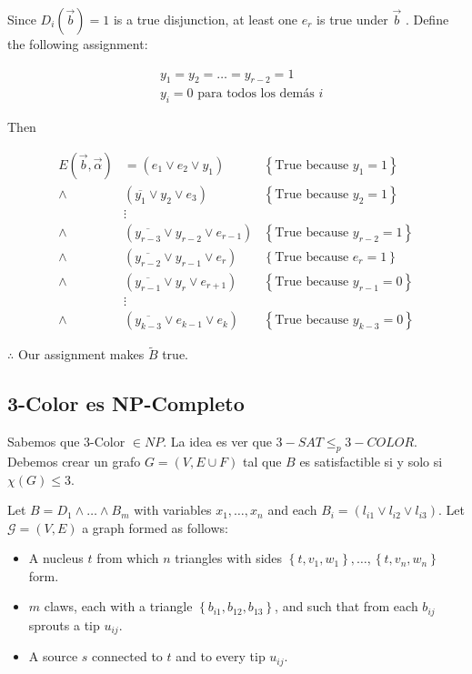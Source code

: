 \documentclass[a4paper, 12pt]{article}
\begin{document}
Since $D_i(\overrightarrow{b}) = 1$ is a true disjunction, at least one $e_r$
is true under $\overrightarrow{b}$ . Define the following assignment:

\begin{align*}
    &y_1 = y_2 = \ldots = y_{r-2} = 1 \\ 
    &y_i = 0 \text{ para todos los demás $i$}
\end{align*}

Then

\begin{align*}
    E(\overrightarrow{b}, \overrightarrow{\alpha}) &= \left( e_1 \lor e_2 \lor y_1 \right) &\left\{ \text{True because } y_1 = 1 \right\}  \\ 
    \land &\left( \overline{y_1} \lor  y_2 \lor  e_3 \right) &\left\{ \text{True because } y_2 = 1 \right\}  \\ 
          &\vdots& \\ 
    \land &(\overline{y_{r-3}} \lor  y_{r-2} \lor  e_{r-1}) &\left\{ \text{True because } y_{r-2} = 1 \right\}  \\ 
    \land&(\overline{y_{r-2}} \lor  y_{r-1} \lor  e_r) &\left\{ \text{True because } e_{r} = 1 \right\}  \\ 
    \land&(\overline{y_{r-1}} \lor y_{r} \lor  e_{r+1}) &\left\{ \text{True because } y_{r-1} = 0 \right\}  \\ 
         &\vdots &\\ 
    \land &(\overline{y_{k-3}} \lor e_{k-1} \lor  e_k) &\left\{ \text{True because } y_{k-3} = 0 \right\} 
\end{align*}

$\therefore $ Our assignment makes $\tilde{ B }$ true.

\pagebreak 


\subsection{3-Color es NP-Completo}

Sabemos que $3$-Color $\in NP$. La idea es ver que $3-SAT \leq_p 3-COLOR$. 
Debemos crear un grafo $G = (V, E \cup F) $ tal que $B$ es satisfactible 
si y solo si $\chi(G) \leq 3$.

Let $B = D_1 \land  \ldots \land  B_m$ with variables $x_1, \ldots, x_n$ and each $B_i
= (l_{i1} \lor l_{i2} \lor  l_{i3})$. Let $\mathcal{G} = (V, E)$ a graph 
formed as follows: 

\begin{itemize}
    \item A nucleus $t$ from which $n$ triangles with sides $\left\{ t, v_1, w_1 \right\}, \ldots, \left\{ t, v_n, w_n \right\}  $ form.
    \item $m$ claws, each with a triangle $\left\{ b_{i1}, b_{12}, b_{13} \right\} $, and such that from each $b_{ij}$ sprouts a tip $u_{ij}$.
    \item A source $s$ connected to $t$ and to every tip $u_{ij}$.
\end{itemize}
\end{document}
